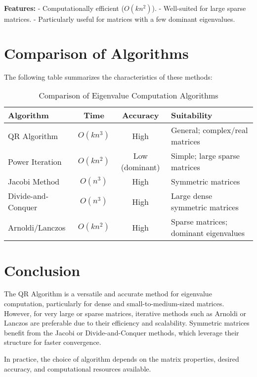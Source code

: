\documentclass[12pt]{article}
\begin{document}
\textbf{Features:}
- Computationally efficient (\( O(kn^2) \)).
- Well-suited for large sparse matrices.
- Particularly useful for matrices with a few dominant eigenvalues.

\section*{Comparison of Algorithms}
The following table summarizes the characteristics of these methods:

\begin{table}[h!]
\centering
\begin{tabular}{|l|c|c|l|}
\hline
\textbf{Algorithm}        & \textbf{Time} & \textbf{Accuracy} & \textbf{Suitability} \\ \hline
QR Algorithm              & \( O(kn^3) \) & High              & General; complex/real matrices \\ \hline
Power Iteration           & \( O(kn^2) \) & Low (dominant)    & Simple; large sparse matrices  \\ \hline
Jacobi Method             & \( O(n^3) \)  & High              & Symmetric matrices             \\ \hline
Divide-and-Conquer        & \( O(n^3) \)  & High              & Large dense symmetric matrices \\ \hline
Arnoldi/Lanczos           & \( O(kn^2) \) & High              & Sparse matrices; dominant eigenvalues \\ \hline
\end{tabular}
\label{tab:eigen-algorithms}
\caption{Comparison of Eigenvalue Computation Algorithms}
\end{table}

\section*{Conclusion}
The QR Algorithm is a versatile and accurate method for eigenvalue computation, particularly for dense and small-to-medium-sized matrices. However, for very large or sparse matrices, iterative methods such as Arnoldi or Lanczos are preferable due to their efficiency and scalability. Symmetric matrices benefit from the Jacobi or Divide-and-Conquer methods, which leverage their structure for faster convergence. 

In practice, the choice of algorithm depends on the matrix properties, desired accuracy, and computational resources available.
\end{document}
